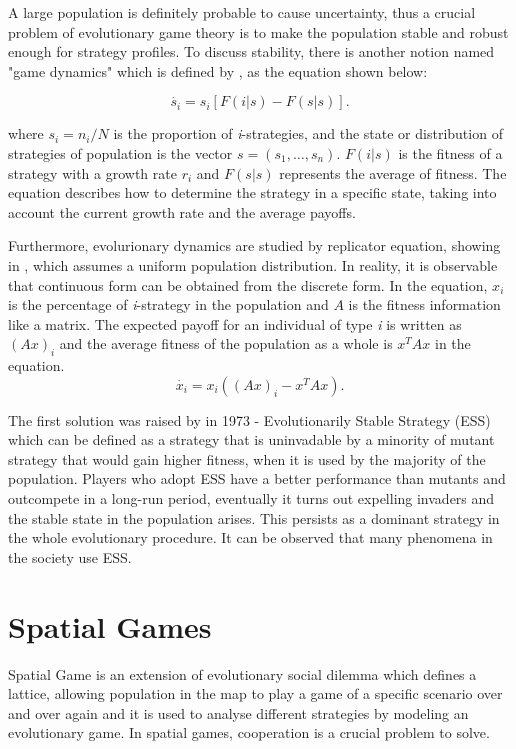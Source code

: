 A large population is definitely probable to cause uncertainty, thus a crucial problem of evolutionary game theory is to make the population stable and robust enough for strategy profiles. To discuss stability, there is another notion named "game dynamics" which is defined by \citep{taylor1978evolutionary}, as the equation shown below:

\begin{equation}\label{eq:2.1}
    \dot{s_i} = s_i [ F(i|s) - F(s|s)].
\end{equation}

where $s_i=n_i/N$ is the proportion of \textit{i}-strategies, and the state or distribution of strategies of population is the vector $s=(s_1, \ldots, s_n)$. $F(i|s)$ is the fitness of a strategy with a growth rate $r_i$ and $F(s|s)$ represents the average of fitness. The equation describes how to determine the strategy in a specific state, taking into account the current growth rate and the average payoffs.

Furthermore, evolurionary dynamics are studied by replicator equation, showing in , which assumes a uniform population distribution. In reality, it is observable that continuous form can be obtained from the discrete form. In the equation, $x_i$ is the percentage of \textit{i}-strategy in the population and $A$ is the fitness information like a matrix. The expected payoff for an individual of type \textit{i} is written as $(Ax)_i$ and the average fitness of the population as a whole is $x^TAx$ in the equation.
\begin{equation}\label{eq:2.2}
    \dot{x_i}=x_i\left(\left(Ax\right)_i-x^TAx\right).
\end{equation}

 The first solution was raised by \citet{smith1973lhe} in 1973 - Evolutionarily Stable Strategy (ESS) which can be defined as a strategy that is uninvadable by a minority of mutant strategy that would gain higher fitness, when it is used by the majority of the population. Players who adopt ESS have a better performance than mutants and outcompete in a long-run period, eventually it turns out expelling invaders and the stable state in the population arises. This persists as a dominant strategy in the whole evolutionary procedure. It can be observed that many phenomena in the society use ESS.

\section{Spatial Games}
Spatial Game is an extension of evolutionary social dilemma which defines a lattice, allowing population in the map to play a game of a specific scenario over and over again and it is used to analyse different strategies by modeling an evolutionary game. In spatial games, cooperation is a crucial problem to solve.

